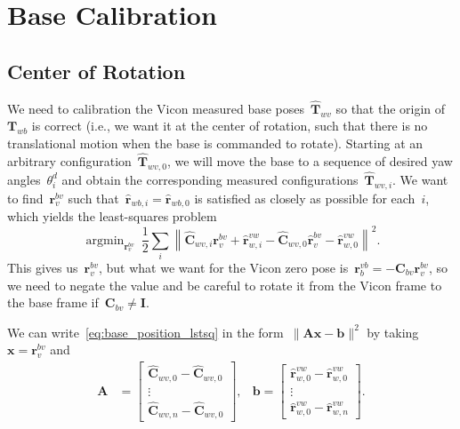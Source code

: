 \documentclass{article}
\DeclareMathOperator*{\argmin}{argmin}
\begin{document}
\section{Base Calibration}

\subsection{Center of Rotation}

We need to calibration the Vicon measured base poses~$\hat{\bm{T}}_{wv}$ so
that the origin of~$\bm{T}_{wb}$ is correct (i.e., we want it at the center of
rotation, such that there is no translational motion when the base is commanded
to rotate). Starting at an arbitrary configuration~$\hat{\bm{T}}_{wv,0}$, we
will move the base to a sequence of desired yaw angles~$\theta^d_i$ and obtain
the corresponding measured configurations~$\hat{\bm{T}}_{wv,i}$. We want to
find~$\bm{r}^{bv}_v$ such that~$\hat{\bm{r}}_{wb,i} = \hat{\bm{r}}_{wb,0}$ is
satisfied as closely as possible for each~$i$, which yields the least-squares
problem
\begin{equation}\label{eq:base_position_lstsq}
  \argmin_{\bm{r}^{bv}_v}\ \frac{1}{2}\sum_i\left\|\hat{\bm{C}}_{wv,i}\bm{r}^{bv}_v + \hat{\bm{r}}^{vw}_{w,i} - \hat{\bm{C}}_{wv,0}\hat{\bm{r}}^{bv}_{v} - \hat{\bm{r}}^{vw}_{w,0}\right\|^2.
\end{equation}
This gives us~$\bm{r}^{bv}_v$, but what we want for the Vicon zero pose is~$\bm{r}^{vb}_b=-\bm{C}_{bv}\bm{r}^{bv}_v$, so we need to negate the value and be careful to rotate it from the Vicon frame to the base frame if~$\bm{C}_{bv}\neq\bm{I}$.

We can write~\eqref{eq:base_position_lstsq} in the form~$\|\bm{A}\bm{x}-\bm{b}\|^2$ by taking~$\bm{x}=\bm{r}^{bv}_v$ and
\begin{align*}
  \bm{A} &= \begin{bmatrix}
    \hat{\bm{C}}_{wv,0} - \hat{\bm{C}}_{wv,0} \\ \vdots \\ \hat{\bm{C}}_{wv,n} - \hat{\bm{C}}_{wv,0}
  \end{bmatrix}, & \bm{b} = \begin{bmatrix}
  \hat{\bm{r}}^{vw}_{w,0} - \hat{\bm{r}}^{vw}_{w,0} \\ \vdots \\ \hat{\bm{r}}^{vw}_{w,0} - \hat{\bm{r}}^{vw}_{w,n}
  \end{bmatrix}.
\end{align*}
\end{document}
